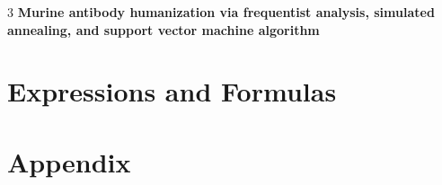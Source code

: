 \documentclass{article}
\begin{document}
\vspace*{3cm}
\thispagestyle{empty}
\begin{center}
    \begin{spacing}{3}
        {\Huge \textbf{Murine antibody humanization via frequentist analysis, simulated annealing, and support vector machine algorithm}}\\
    \end{spacing}

\vspace*{1cm}


\end{center}
\newpage
\tableofcontents
\newpage



\section{Expressions and Formulas}








\newpage
\section*{Appendix}


\end{document}
